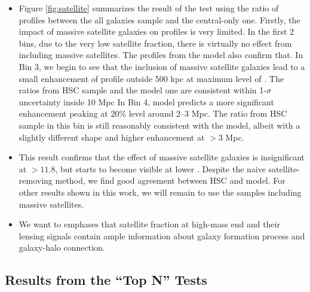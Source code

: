 \documentclass[a4paper,fleqn,usenatbib]{mnras}
\begin{document}
\begin{itemize}
        \item Figure \ref{fig:satellite} summarizes the result of the test using the ratio
            of \dsigma{} profiles between the all galaxies sample and the central-only one.
            Firstly, the impact of massive satellite galaxies on \dsigma{} profiles is very limited.
            In the first 2 bins, due to the very low satellite fraction, there is virtually no
            effect from including massive satellites.
            The \dsigma{} profiles from the model also confirm that.
            In Bin 3, we begin to see that the inclusion of massive satellite galaxies
            lead to a small enhancement of \dsigma{} profile outside 500 kpc at maximum level
            of . The ratios from HSC sample and the  model one are consistent
            within 1-$\sigma$ uncertainty inside 10 Mpc
            In Bin 4,  model predicts a more significant enhancement peaking at
            20\% level around 2--3 Mpc.
            The ratio from HSC sample in this bin is still reasonably consistent with the model,
            albeit with a slightly different shape and higher enhancement at $>3$ Mpc.

        \item This result confirms that the effect of massive satellite galaxies is insignificant
            at \logmmax{}$>11.8$, but starts to become visible at lower \mmax{}.
            Despite the naive satellite-removing method, we find good agreement between HSC and
            model.
            For other results shown in this work, we will remain to use the samples including
            massive satellites.

        \item We want to emphases that satellite fraction at high-mass end and their lensing
            signals contain ample information about galaxy formation process and galaxy-halo
            connection.

    \end{itemize}

\subsection{Results from the ``Top N'' Tests}
    \label{sec:topn_results}
\end{document}
